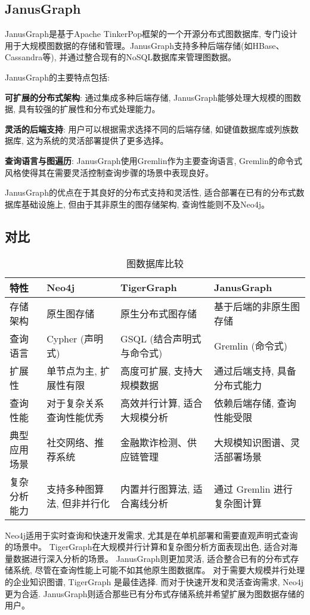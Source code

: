 \subsection{JanusGraph}

JanusGraph是基于Apache TinkerPop框架的一个开源分布式图数据库, 专门设计用于大规模图数据的存储和管理。JanusGraph支持多种后端存储(如HBase、Cassandra等), 并通过整合现有的NoSQL数据库来管理图数据。

JanusGraph的主要特点包括:

\textbf{可扩展的分布式架构}: 通过集成多种后端存储, JanusGraph能够处理大规模的图数据, 具有较强的扩展性和分布式处理能力。

\textbf{灵活的后端支持}: 用户可以根据需求选择不同的后端存储, 如键值数据库或列族数据库, 这为系统的灵活部署提供了更多选择。

\textbf{查询语言与图遍历}: JanusGraph使用Gremlin作为主要查询语言, Gremlin的命令式风格使得其在需要灵活控制查询步骤的场景中表现良好。

JanusGraph的优点在于其良好的分布式支持和灵活性, 适合部署在已有的分布式数据库基础设施上, 但由于其非原生的图存储架构, 查询性能则不及Neo4j。


\subsection{对比}



\begin{table}[htbp]
	\centering
	\caption{图数据库比较}
	\begin{tabularx}{\textwidth}{|X|X|X|X|}
		\hline
		\textbf{特性} & \textbf{Neo4j} & \textbf{TigerGraph} & \textbf{JanusGraph} \\
		\hline
		存储架构        & 原生图存储          & 原生分布式图存储            & 基于后端的非原生图存储         \\
		\hline
		查询语言        & Cypher (声明式)   & GSQL (结合声明式与命令式)    & Gremlin (命令式)       \\
		\hline
		扩展性         & 单节点为主, 扩展性有限   & 高度可扩展, 支持大规模数据      & 通过后端支持, 具备分布式能力     \\
		\hline
		查询性能        & 对于复杂关系查询性能优秀   & 高效并行计算, 适合大规模分析     & 依赖后端存储, 查询性能受限      \\
		\hline
		典型应用场景      & 社交网络、推荐系统      & 金融欺诈检测、供应链管理        & 大规模知识图谱、灵活部署场景      \\
		\hline
		复杂分析能力      & 支持多种图算法, 但非并行化 & 内置并行图算法, 适合离线分析     & 通过 Gremlin 进行复杂图计算  \\
		\hline
	\end{tabularx}
	\label{tab:graph_comparison}
\end{table}

Neo4j适用于实时查询和快速开发需求, 尤其是在单机部署和需要直观声明式查询的场景中。
TigerGraph在大规模并行计算和复杂图分析方面表现出色, 适合对海量数据进行深入分析的场景。
JanusGraph则更加灵活, 适合整合已有的分布式存储系统, 尽管在查询性能上可能不如其他原生图数据库。
对于需要大规模并行处理的企业知识图谱, TigerGraph 是最佳选择. 而对于快速开发和灵活查询需求, Neo4j 更为合适. JanusGraph则适合那些已有分布式存储系统并希望扩展为图数据存储的用户。
